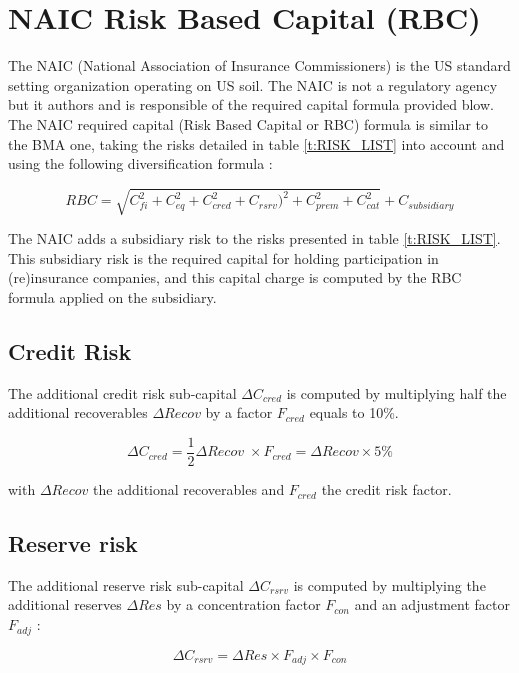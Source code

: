 \section{NAIC Risk Based Capital (RBC)}
\label{sec:NAIC_RBC_PRESENTATION}

The NAIC (National Association of Insurance Commissioners) is the US standard setting organization operating on US soil. The NAIC is not a regulatory agency but it authors and is responsible of the required capital formula provided blow. The NAIC required capital (Risk Based Capital or RBC) formula is similar to the BMA one, taking the risks detailed in table \ref{t:RISK_LIST} into account and using the following diversification formula :

\begin{equation}
	RBC = \sqrt{C_{fi}^2 + C_{eq}^2 + C_{cred}^2 + C_{rsrv} )^2 + C_{prem}^2 + C_{cat}^2} + C_{subsidiary}
\end{equation}

The NAIC adds a subsidiary risk to the risks presented in table \ref{t:RISK_LIST}. This subsidiary risk is the required capital for holding participation in (re)insurance companies, and this capital charge is computed by the RBC formula applied on the subsidiary. 

\subsection{Credit Risk}

The additional credit risk sub-capital $\Delta C_{cred}$ is computed by multiplying half the additional recoverables $\Delta Recov$ by a factor $F_{cred}$ equals to 10\%. 

\begin{equation}
	\Delta C_{cred} = \frac{1}{2}\Delta Recov \; \times F_{cred} = \Delta Recov \times 5\%
\end{equation}

with $\Delta Recov$ the additional recoverables and $F_{cred}$ the credit risk factor.


\subsection{Reserve risk}

The additional reserve risk sub-capital $\Delta C_{rsrv}$ is computed by multiplying the additional reserves $\Delta Res$ by a concentration factor $F_{con}$ and an adjustment factor $F_{adj}$ :

\begin{equation}
	\Delta C_{rsrv} = \Delta Res \times F_{adj} \times F_{con}
\end{equation}

